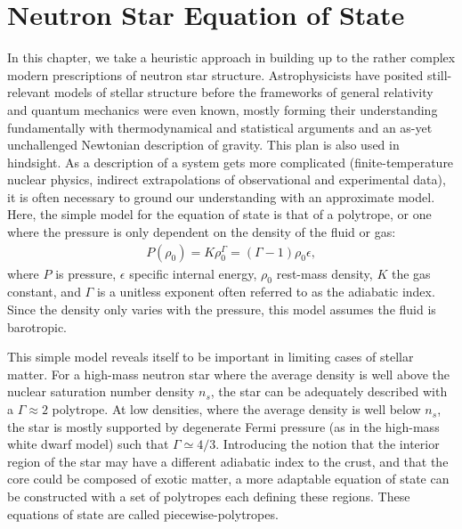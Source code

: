 \chapter{Neutron Star Equation of State}
\label{chap:chapter-2}

In this chapter, we take a heuristic approach in building up to the rather complex modern prescriptions of neutron star structure. 
Astrophysicists have posited still-relevant models of stellar structure before the frameworks of general relativity and quantum mechanics were even known, mostly forming their understanding fundamentally with thermodynamical and statistical arguments and an as-yet unchallenged Newtonian description of gravity.
This plan is also used in hindsight.
As a description of a system gets more complicated (finite-temperature nuclear physics, indirect extrapolations of observational and experimental data), it is often necessary to ground our understanding with an approximate model.
Here, the simple model for the equation of state is that of a polytrope, or one where the pressure is only dependent on the density of the fluid or gas:
\begin{align}
P(\rho_0) = K \rho_0^\Gamma = (\Gamma -  1) \rho_0 \epsilon,
\end{align}
where $P$ is pressure, $\epsilon$ specific internal energy, $\rho_0$ rest-mass density, $K$ the gas constant, and $\Gamma$ is a unitless exponent often referred to as the adiabatic index.
Since the density only varies with the pressure, this model assumes the fluid is barotropic.

This simple model reveals itself to be important in limiting cases of stellar matter.  
For a high-mass neutron star where the average density is well above the nuclear saturation number density $n_s$, the star can be adequately described with a $\Gamma \approx 2$ polytrope.  
At low densities, where the average density is well below $n_s$, the star is mostly supported by degenerate Fermi pressure (as in the high-mass white dwarf model) such that $\Gamma \simeq 4/3$.
Introducing the notion that the interior region of the star may have a different adiabatic index to the crust, and that the core could be composed of exotic matter, a more adaptable equation of state can be constructed with a set of polytropes each defining these regions.  
These equations of state are called piecewise-polytropes.  

